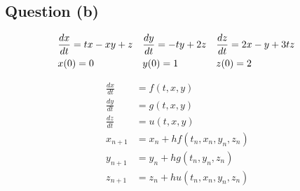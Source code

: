 	\subsection{Question (b)}
		\begin{align}
			&\frac{dx}{dt} = tx - xy + z&
			&\frac{dy}{dt} = -ty + 2z&
			&\frac{dz}{dt} = 2x - y + 3tz&
			\notag \\
			&x(0) = 0&
			&y(0) = 1&
			&z(0) = 2&
		\end{align}

		\begin{align}
			\frac{dx}{dt} &= f(t,x,y)& \\
			\frac{dy}{dt} &= g(t,x,y)& \\
			\frac{dz}{dt} &= u(t,x,y)& \\
			x_{n+1} &= x_{n} + hf(t_{n},x_{n},y_{n},z_{n})& \\
			y_{n+1} &= y_{n} + hg(t_{n},y_{n},z_{n})& \\
			z_{n+1} &= z_{n} + hu(t_{n},x_{n},y_{n},z_{n})&
		\end{align}

